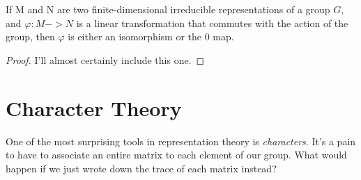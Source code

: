 \begin{theorem}
    If M and N are two finite-dimensional irreducible representations of a group $G$, and $\varphi:M->N$ is a 
    linear transformation that commutes with the action of the group, then $\varphi$ is either an isomorphism or 
    the $0$ map.
\end{theorem}


            

\begin{proof}
    I'll almost certainly include this one.
\end{proof}


\section{Character Theory}

One of the most surprising tools in representation theory is \emph{characters}. It's a pain to have to associate an 
entire matrix to each element of our group. What would happen if we just wrote down the trace of each matrix 
instead?






